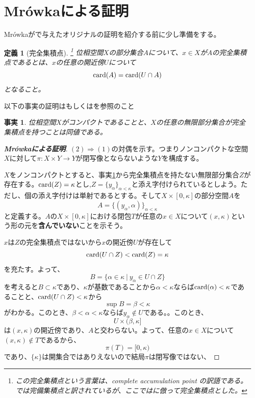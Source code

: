 \documentclass[leqno]{jsarticle}
\newtheorem{df}[thm]{定義}
\newtheorem{fact}[thm]{事実}
\newcommand{\To}{\Longrightarrow}
\newcommand{\al}{\alpha}
\newcommand{\be}{\beta}
\newcommand{\card}{\text{{\rm card}}}
\newcommand{\kk}{\kappa}
\begin{document}
\section{Mr\'owkaによる証明}
Mr\'owkaが\cite{m}で与えたオリジナルの証明を紹介する前に少し準備をする。
\begin{df}[完全集積点]\footnote{この完全集積点という言葉は、complete accumulation point の訳語である。\cite{algd}では完備集積点と訳されているが、ここでは\cite{pon}に倣って完全集積点とした。}
位相空間$X$の部分集合$A$について、$x\in X$が$A$の完全集積点であるとは、$x$の任意の開近傍$U$について
\[
\card(A)=\card(U\cap A)
\]
となること。
\end{df}
以下の事実の証明は\cite{algd}もしくは\cite{pon}を参照のこと
\begin{fact}\label{ff}
位相空間$X$がコンパクトであることと、$X$の任意の無限部分集合が完全集積点を持つことは同値である。
\end{fact}
\begin{proof}[\textbf{Mr\'owkaによる証明}]
$(2)\To(1)$の対偶を示す。つまりノンコンパクトな空間$X$に対して$\pi: X\times Y\to Y$が閉写像とならないような$Y$を構成する。\par
$X$をノンコンパクトとすると、事実\ref{ff}から完全集積点を持たない無限部分集合$Z$が存在する。$\card(Z)=\kk$とし,$Z=\{y_{\al}\}_{\al<\kk}$と添え字付けられているとしよう。ただし、個の添え字付けは単射であるとする。そして$X\times [0,\kk]$の部分空間$A$を
\[
A=\{(y_{\al}, \al)\}_{\al<\kk}
\]
と定義する。$A$の$X\times [0,\kk]$における閉包$T$が任意の$x\in X$について$(x,\kk)$という形の元を\textbf{含んでいない}ことを示そう。\par
$x$は$Z$の完全集積点ではないから$x$の開近傍$U$が存在して
\[
\card(U\cap Z)<\card(Z)=\kk
\]
を充たす。よって、
\[
B=\{\al\in \kk\ |\ y_{\al}\in U\cap Z \}
\]
を考えると$B\subset \kk$であり、$\kk$が基数であることから$\al<\kk$ならば$\card(\al)<\kk$であることと、$\card(U\cap Z)<\kk$から
\[
\sup B=\be<\kk
\]
がわかる。このとき、$\be<\al<\kk$ならば$y_{\al}\not\in U$である。。このとき、
\[
U\times (\be,\kk]
\]
は$(x,\kk)$の開近傍であり、$A$と交わらない。よって、任意の$x\in X$について$(x,\kk)\not\in T$であるから、
\[
\pi(T)=[0,\kk)
\]
であり、$\{\kk\}$は開集合ではありえないので結局$\pi$は閉写像ではない、
\end{proof}
\end{document}

